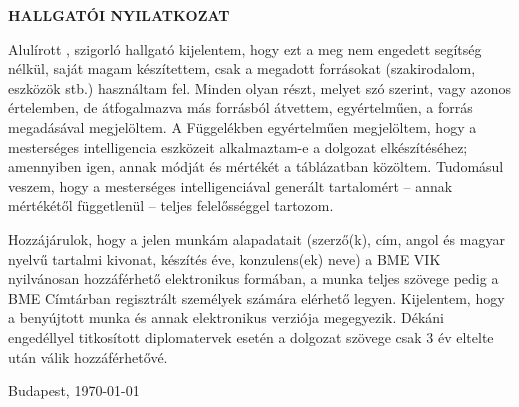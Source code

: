 \begin{center}
\large
\textbf{HALLGATÓI NYILATKOZAT}\\
\end{center}

Alulírott \emph{\vikszerzoVezeteknev{} \vikszerzoKeresztnev}, szigorló hallgató kijelentem, hogy ezt a \vikmunkatipusat{} meg nem engedett segítség nélkül, saját magam készítettem, csak a megadott forrásokat (szakirodalom, eszközök stb.) használtam fel. Minden olyan részt, melyet szó szerint, vagy azonos értelemben, de átfogalmazva más forrásból átvettem, egyértelműen, a forrás megadásával megjelöltem. A Függelékben egyértelműen megjelöltem, hogy a mesterséges intelligencia eszközeit alkalmaztam-e a dolgozat elkészítéséhez; amennyiben igen, annak módját és mértékét a táblázatban közöltem. Tudomásul veszem, hogy a mesterséges intelligenciával generált tartalomért -- annak mértékétől függetlenül -- teljes felelősséggel tartozom.

Hozzájárulok, hogy a jelen munkám alapadatait (szerző(k), cím, angol és magyar nyelvű tartalmi kivonat, készítés éve, konzulens(ek) neve) a BME VIK nyilvánosan hozzáférhető elektronikus formában, a munka teljes szövege pedig a BME Címtárban regisztrált személyek számára elérhető legyen. Kijelentem, hogy a benyújtott munka és annak elektronikus verziója megegyezik. Dékáni engedéllyel titkosított diplomatervek esetén a dolgozat szövege csak 3 év eltelte után válik hozzáférhetővé.

\begin{flushleft}
\vspace*{1cm}
Budapest, \today
\end{flushleft}

\begin{flushright}
 \vspace*{1cm}
 \makebox[7cm]{\rule{6cm}{.4pt}}\\
 \makebox[7cm]{\emph{\vikszerzoVezeteknev{} \vikszerzoKeresztnev}}\\
\end{flushright}
\thispagestyle{empty}

\vfill
\clearpage
\thispagestyle{empty} %

\selectthesislanguage
